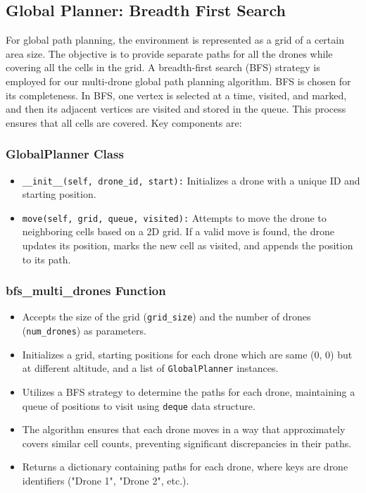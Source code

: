 
\subsection{Global Planner: Breadth First Search}

For global path planning, the environment is represented as a grid of a certain area size. The objective is to provide separate paths for all the drones while covering all the cells in the grid. A breadth-first search (BFS) strategy is employed for our multi-drone global path planning algorithm. BFS is chosen for its completeness. In BFS, one vertex is selected at a time, visited, and marked, and then its adjacent vertices are visited and stored in the queue. This process ensures that all cells are covered. Key components are:

\subsubsection{GlobalPlanner Class}

\begin{itemize}
    \item \texttt{\_\_init\_\_(self, drone\_id, start):} Initializes a drone with a unique ID and starting position.
    \item \texttt{move(self, grid, queue, visited):} Attempts to move the drone to neighboring cells based on a 2D grid. If a valid move is found, the drone updates its position, marks the new cell as visited, and appends the position to its path.
\end{itemize}

\subsubsection{bfs\_multi\_drones Function}

\begin{itemize}
    \item Accepts the size of the grid (\texttt{grid\_size}) and the number of drones (\texttt{num\_drones}) as parameters.
    \item Initializes a grid, starting positions for each drone which are same (0, 0) but at different altitude, and a list of \texttt{GlobalPlanner} instances.
    \item Utilizes a BFS strategy to determine the paths for each drone, maintaining a queue of positions to visit using \texttt{deque} data structure.
    \item The algorithm ensures that each drone moves in a way that approximately covers similar cell counts, preventing significant discrepancies in their paths.
    \item Returns a dictionary containing paths for each drone, where keys are drone identifiers ("Drone 1", "Drone 2", etc.).
\end{itemize}

